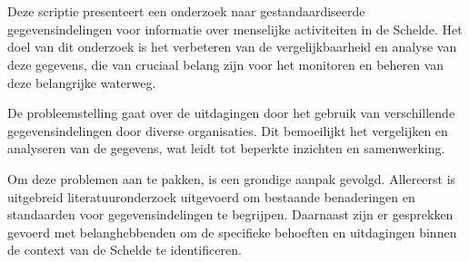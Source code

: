 
%
%
%
%
%

%



\chapter*{}

Deze scriptie presenteert een onderzoek naar gestandaardiseerde gegevensindelingen voor informatie over menselijke activiteiten in de Schelde. Het doel van dit onderzoek is het verbeteren van de vergelijkbaarheid en analyse van deze gegevens, die van cruciaal belang zijn voor het monitoren en beheren van deze belangrijke waterweg.

De probleemstelling gaat over de uitdagingen door het gebruik van verschillende gegevensindelingen door diverse organisaties. Dit bemoeilijkt het vergelijken en analyseren van de gegevens, wat leidt tot beperkte inzichten en samenwerking.

Om deze problemen aan te pakken, is een grondige aanpak gevolgd. Allereerst is uitgebreid literatuuronderzoek uitgevoerd om bestaande benaderingen en standaarden voor gegevensindelingen te begrijpen. Daarnaast zijn er gesprekken gevoerd met belanghebbenden om de specifieke behoeften en uitdagingen binnen de context van de Schelde te identificeren.

